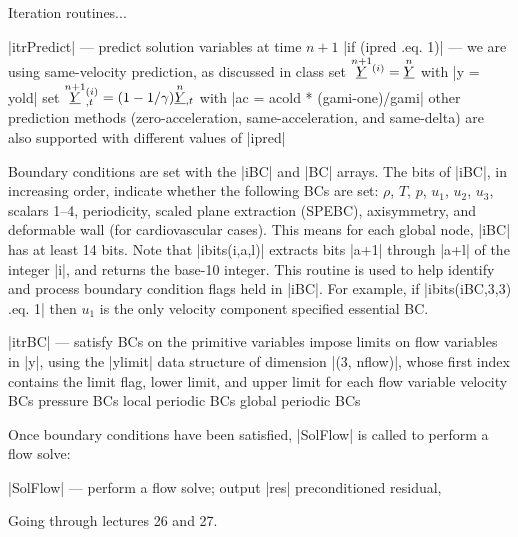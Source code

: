 \documentclass[11pt]{article}
\begin{document}
Iteration routines...

\begin{outline}[deep]
\1 |itrPredict| --- predict solution variables at time $n+1$
	\2 |if (ipred .eq. 1)| --- we are using same-velocity prediction, as discussed in class
		\3 set $\oset{n+1}{\ul{Y}}^{(i)} = \oset{n}{\ul{Y}}$ with |y = yold|
		\3 set $\oset{n+1}{\ul{Y}}^{(i)}_{,t} = (1-1/\gamma) \oset{n}{\ul{Y}}_{,t}$ with |ac = acold * (gami-one)/gami|
	\2 other prediction methods (zero-acceleration, same-acceleration, and same-delta) are also supported with different values of |ipred|
\end{outline}

Boundary conditions are set with the |iBC| and |BC| arrays. The bits of |iBC|, in increasing order, indicate whether the following BCs are set: $\rho$, $T$, $p$, $u_1$, $u_2$, $u_3$, scalars 1--4, periodicity, scaled plane extraction (SPEBC), axisymmetry, and deformable wall (for cardiovascular cases). This means for each global node, |iBC| has at least 14 bits. Note that |ibits(i,a,l)| extracts bits |a+1| through |a+l| of the integer |i|, and returns the base-10 integer. This routine is used to help identify and process boundary condition flags held in |iBC|. For example, if |ibits(iBC,3,3) .eq. 1| then $u_1$ is the only velocity component specified essential BC.
\begin{outline}[deep]
\1 |itrBC| --- satisfy BCs on the primitive variables
	\2 impose limits on flow variables in |y|, using the |ylimit| data structure of dimension |(3, nflow)|, whose first index contains the limit flag, lower limit, and upper limit for each flow variable
	\2 velocity BCs
		\3 
	\2 pressure BCs
		\3 
	\2 local periodic BCs
	\2 global periodic BCs
\end{outline}

Once boundary conditions have been satisfied, |SolFlow| is called to perform a flow solve:
\begin{outline}[deep]
\1 |SolFlow| --- perform a flow solve; output |res| preconditioned residual, 
	\2 
\end{outline}

Going through lectures 26 and 27.
\end{document}
